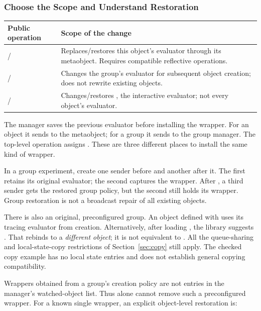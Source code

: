 \subsubsection{Choose the Scope and Understand Restoration}

\begin{longtable}{L{0.33\textwidth}L{0.57\textwidth}}
\textbf{Public operation} & \textbf{Scope of the change}\\\hline
{} /  & Replaces/restores this object's
evaluator through its metaobject. Requires compatible reflective operations.\\
 /  & Changes the group's
evaluator for subsequent object creation; does not rewrite existing objects.\\
 /  & Changes/restores
, the interactive evaluator; not every object's evaluator.\\
\end{longtable}

The manager saves the previous evaluator before installing the wrapper.
For an object it sends  to the metaobject;
for a group it sends  to the group
manager. The top-level operation assigns . These are three
different places to install the same kind of wrapper.

In a group experiment, create one sender before  and
another after it. The first retains its original evaluator; the second
captures the wrapper. After , a third sender gets the
restored group policy, but the second still holds its wrapper. Group
restoration is not a broadcast repair of all existing objects.

There is also an original, preconfigured  group. An object
defined with  uses its tracing evaluator from
creation. Alternatively, after loading , the library suggests
. That rebinds  to a
\emph{different object}; it is not equivalent to .
All the queue-sharing and local-state-copy restrictions of
Section~\ref{sec:copy} still apply. The checked copy example has no local
state entries and does not establish general copying compatibility.

Wrappers obtained from a group's creation policy are not entries in the
manager's watched-object list. Thus  alone cannot
remove such a preconfigured wrapper. For a known single wrapper, an
explicit object-level restoration is:

